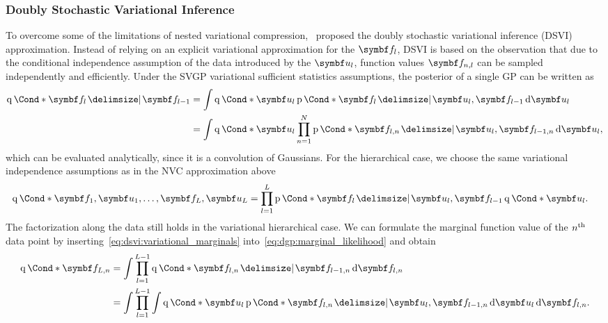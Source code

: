 \subsubsection{Doubly Stochastic Variational Inference}
\label{toc:dsvi}
To overcome some of the limitations of nested variational compression,~\textcite{salimbeni_doubly_2017} proposed the doubly stochastic variational inference (DSVI) approximation.
Instead of relying on an explicit variational approximation for the $\mat{f}_l$, DSVI is based on the observation that due to the conditional independence assumption of the data introduced by the $\mat{u}_l$, function values $\mat{f}_{n,l}$ can be sampled independently and efficiently.
Under the SVGP variational sufficient statistics assumptions, the posterior of a single GP can be written as
\begin{align}
    \begin{split}
        \label{eq:dsvi:variational_marginals}
        \Variat*{\mat{f}_l \given \mat{f}_{l-1}}
        &=
        \int \Variat*{\mat{u}_l}
        \Prob*{\mat{f}_l \given \mat{u}_l, \mat{f}_{l-1}}
        \diff \mat{u}_l
        \\
        &=
        \int \Variat*{\mat{u}_l}
        \prod_{n=1}^N \Prob*{\mat{f}_{l,n} \given \mat{u}_l, \mat{f}_{l-1, n}}
        \diff \mat{u}_l,
    \end{split}
\end{align}
which can be evaluated analytically, since it is a convolution of Gaussians.
For the hierarchical case, we choose the same variational independence assumptions as in the NVC approximation above
\begin{align}
    \begin{split}
        \label{eq:dsvi:variational_distribution}
        \Variat*{\mat{f}_1, \mat{u}_1, \dots, \mat{f}_L, \mat{u}_L}
        &= \prod_{l=1}^L \Prob*{\mat{f}_l \given \mat{u}_l, \mat{f}_{l-1}} \Variat*{\mat{u}_l}.
    \end{split}
\end{align}
The factorization along the data still holds in the variational hierarchical case.
We can formulate the marginal function value of the $n^{\text{th}}$ data point by inserting~\cref{eq:dsvi:variational_marginals} into~\cref{eq:dgp:marginal_likelihood} and obtain
\begin{align}
    \begin{split}
        \label{eq:dsvi:variational_layers}
        \Variat*{\mat{f}_{L,n}}
        &= \int \prod_{l=1}^{L-1} \Variat*{\mat{f}_{l,n} \given \mat{f}_{l-1,n}} \diff \mat{f}_{l, n} \\
        &= \int \prod_{l=1}^{L-1} \int \Variat*{\mat{u}_l} \Prob*{\mat{f}_{l,n} \given \mat{u}_l, \mat{f}_{l-1, n}} \diff \mat{u}_l \diff \mat{f}_{l, n}.
    \end{split}
\end{align}
